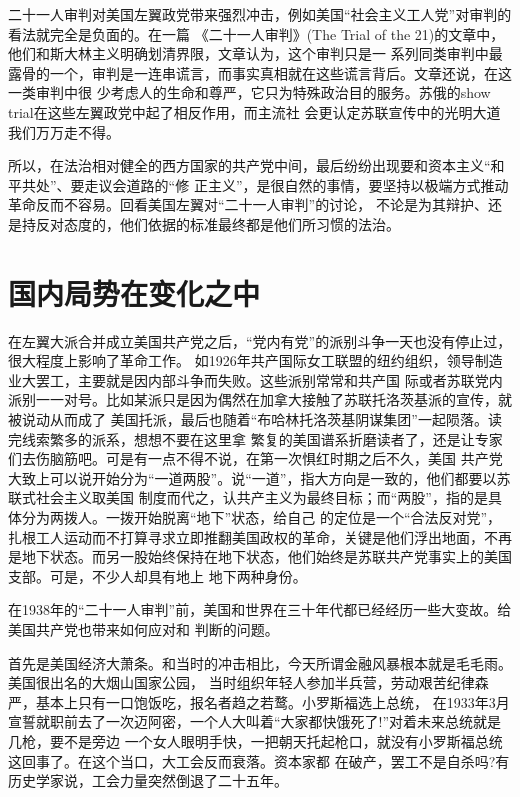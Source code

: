\documentclass[10pt]{article}
\begin{document}
{二十一人审判对美国左翼政党带来强烈冲击，例如美国``社会主义工人党''对审判的看法就完全是负面的。在一篇
《二十一人审判》(The Trial of the 21)的文章中，他们和斯大林主义明确划清界限，文章认为，这个审判只是一
系列同类审判中最露骨的一个，审判是一连串谎言，而事实真相就在这些谎言背后。文章还说，在这一类审判中很
少考虑人的生命和尊严，它只为特殊政治目的服务。苏俄的show trial在这些左翼政党中起了相反作用，而主流社
会更认定苏联宣传中的光明大道我们万万走不得。

所以，在法治相对健全的西方国家的共产党中间，最后纷纷出现要和资本主义``和平共处''、要走议会道路的``修
正主义''，是很自然的事情，要坚持以极端方式推动革命反而不容易。回看美国左翼对``二十一人审判''的讨论，
不论是为其辩护、还是持反对态度的，他们依据的标准最终都是他们所习惯的法治。

\pagebreak
\section{国内局势在变化之中}

在左翼大派合并成立美国共产党之后，``党内有党''的派别斗争一天也没有停止过，很大程度上影响了革命工作。
如1926年共产国际女工联盟的纽约组织，领导制造业大罢工，主要就是因内部斗争而失败。这些派别常常和共产国
际或者苏联党内派别一一对号。比如某派只是因为偶然在加拿大接触了苏联托洛茨基派的宣传，就被说动从而成了
美国托派，最后也随着``布哈林\myrule 托洛茨基阴谋集团''一起陨落。读完线索繁多的派系，想想不要在这里拿
繁复的美国谱系折磨读者了，还是让专家们去伤脑筋吧。可是有一点不得不说，在第一次惧红时期之后不久，美国
共产党大致上可以说开始分为``一道两股''。说``一道''，指大方向是一致的，他们都要以苏联式社会主义取美国
制度而代之，认共产主义为最终目标；而``两股''，指的是具体分为两拨人。一拨开始脱离``地下''状态，给自己
的定位是一个``合法反对党''，扎根工人运动而不打算寻求立即推翻美国政权的革命，关键是他们浮出地面，不再
是地下状态。而另一股始终保持在地下状态，他们始终是苏联共产党事实上的美国支部。可是，不少人却具有地上
地下两种身份。

在1938年的``二十一人审判''前，美国和世界在三十年代都已经经历一些大变故。给美国共产党也带来如何应对和
判断的问题。

首先是美国经济大萧条。和当时的冲击相比，今天所谓金融风暴根本就是毛毛雨。美国很出名的大烟山国家公园，
当时组织年轻人参加半兵营，劳动艰苦纪律森严，基本上只有一口饱饭吃，报名者趋之若鹜。小罗斯福选上总统，
在1933年3月宣誓就职前去了一次迈阿密，一个人大叫着``大家都快饿死了!''对着未来总统就是几枪，要不是旁边
一个女人眼明手快，一把朝天托起枪口，就没有小罗斯福总统这回事了。在这个当口，大工会反而衰落。资本家都
在破产，罢工不是自杀吗?有历史学家说，工会力量突然倒退了二十五年。

}
\end{document}
